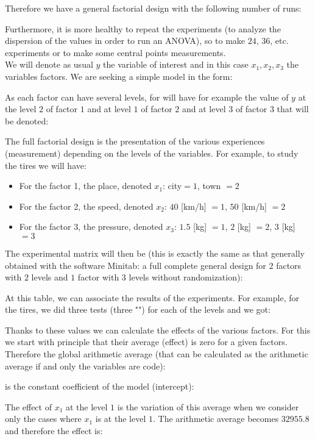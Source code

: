 	Therefore we have a general factorial design with the following number of runs:
	
 	Furthermore, it is more healthy to repeat the experiments (to analyze the dispersion of the values in order to run an ANOVA), so to make $24$, $36$, etc. experiments or to make some central points measurements.\\

	We will denote as usual $y$ the variable of interest and in this case $x_1,x_2,x_3$ the variables factors. We are seeking a simple model in the form:
	
	As each factor can have several levels, for will have for example the value of $y$ at the level $2$ of factor $1$ and at level $1$ of factor $2$ and at level $3$ of factor $3$ that will be denoted:
	
	
	The full factorial design is the presentation of the various experiences (measurement) depending on the levels of the variables. For example, to study the tires we will have:
	\begin{itemize}
		\item For the factor 1, the place, denoted $x_1$: city$=1$, town $=2$

		\item For the factor 2, the speed, denoted $x_2$: $40$ [km/h] $=1$, $50$ [km/h] $=2$

		\item For the factor 3, the pressure, denoted $x_3$: $1.5$ [kg] $=1$, $2$ [kg] $=2$, $3$ [kg] $=3$
	\end{itemize}
	The experimental matrix will then be (this is exactly the same as that generally obtained with the software Minitab: a full complete general design for $2$ factors with $2$ levels and $1$ factor with $3$ levels without randomization):
	
	At this table, we can associate the results of the experiments. For example, for the tires, we did three tests (three "") for each of the levels and we got:
	

	Thanks to these values we can calculate the effects of the various factors. For this we start with principle that their average (effect) is zero for a given factors. Therefore the global arithmetic average (that can be calculated as the arithmetic average if and only the variables are code):
	
	is the constant coefficient of the model (intercept):
	
	The effect of $x_1$ at the level $1$ is the variation of this average when we consider only the cases where $x_1$ is at the level $1$. The arithmetic average becomes $32955.8$ and therefore the effect is:
	
